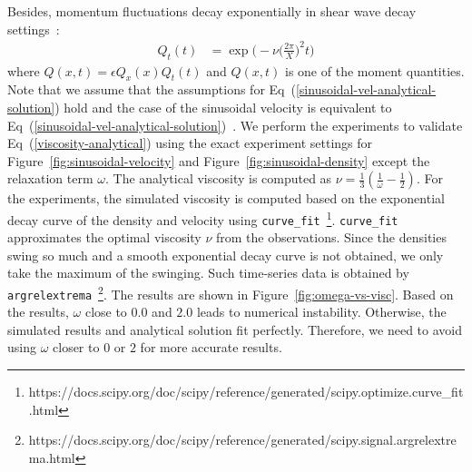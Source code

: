 Besides, momentum fluctuations decay exponentially in shear wave decay settings~\cite{palmer1994transverse, hess2002determining}:
\begin{equation}
  \begin{aligned}
    Q_t(t) &= \exp\biggl(
      -\nu \biggl(
        \frac{2\pi}{X}
      \biggr)^2 t\biggr)
  \end{aligned}
  \label{viscosity-analytical}
\end{equation}
where $Q(x, t) = \epsilon Q_x(x) Q_t(t)$
and $Q(x, t)$ is one of the moment quantities.
Note that we assume that the assumptions for Eq~(\ref{sinusoidal-vel-analytical-solution}) hold
and the case of the sinusoidal velocity is equivalent to Eq~(\ref{sinusoidal-vel-analytical-solution})~\cite{fei2018three}.
We perform the experiments to validate Eq~(\ref{viscosity-analytical}) using 
the exact experiment settings for Figure~\ref{fig:sinusoidal-velocity}
and Figure~\ref{fig:sinusoidal-density}
except the relaxation term $\omega$.
The analytical viscosity is computed as $\nu = \frac{1}{3} (\frac{1}{\omega} - \frac{1}{2})$.
For the experiments, the simulated viscosity is computed based on the exponential decay curve
of the density and velocity using 
{\tt curve\_fit}~\footnote{https://docs.scipy.org/doc/scipy/reference/generated/scipy.optimize.curve\_fit.html}.
{\tt curve\_fit} approximates the optimal viscosity $\nu$ from the observations.
Since the densities swing so much and a smooth exponential decay curve
is not obtained, we only take the maximum of the swinging.
Such time-series data is obtained by
{\tt argrelextrema}~\footnote{https://docs.scipy.org/doc/scipy/reference/generated/scipy.signal.argrelextrema.html}.
The results are shown in Figure~\ref{fig:omega-vs-visc}.
Based on the results, $\omega$ close to $0.0$ and $2.0$
leads to numerical instability.
Otherwise, the simulated results and analytical solution fit perfectly.
Therefore, we need to avoid using $\omega$ closer to $0$ or $2$ for more accurate results.

